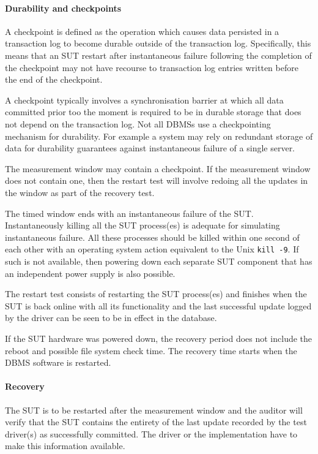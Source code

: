 \paragraph{Durability and checkpoints}

A checkpoint is defined as the operation which causes data persisted in a transaction log to become durable outside of the transaction log. Specifically, this means that an SUT restart after instantaneous failure following the completion of the checkpoint may not have recourse to transaction log entries written before the end of the checkpoint.

A checkpoint typically involves a synchronisation barrier at which all data committed prior too the moment is required to be in durable storage that does not depend on the transaction log.
Not all DBMSs use a checkpointing mechanism for durability. For example a system may rely on redundant storage of data for durability guarantees against instantaneous failure of a single server.

The measurement window may contain a checkpoint. If the measurement window does not contain one, then the restart test will involve redoing all the updates in the window as part of the recovery test.

The timed window ends with an instantaneous failure of the SUT. Instantaneously killing all the SUT process(es) is adequate for simulating instantaneous failure. All these processes should be killed within one second of each other with an operating system action equivalent to the Unix \verb+kill -9+. If such is not available, then powering down each separate SUT component that has an independent power supply is also possible.

The restart test consists of restarting the SUT process(es) and finishes when the SUT is back online with all its functionality and the last successful update logged by the driver can be seen to be in effect in the database.

If the SUT hardware was powered down, the recovery period does not include the reboot and possible file system check time. The recovery time starts when the DBMS software is restarted.




\paragraph{Recovery} 
The SUT is to be restarted after the measurement window and the auditor will verify that the SUT contains the entirety of the last update recorded by the test driver(s) as successfully committed. The driver or the implementation have to make this information available.

